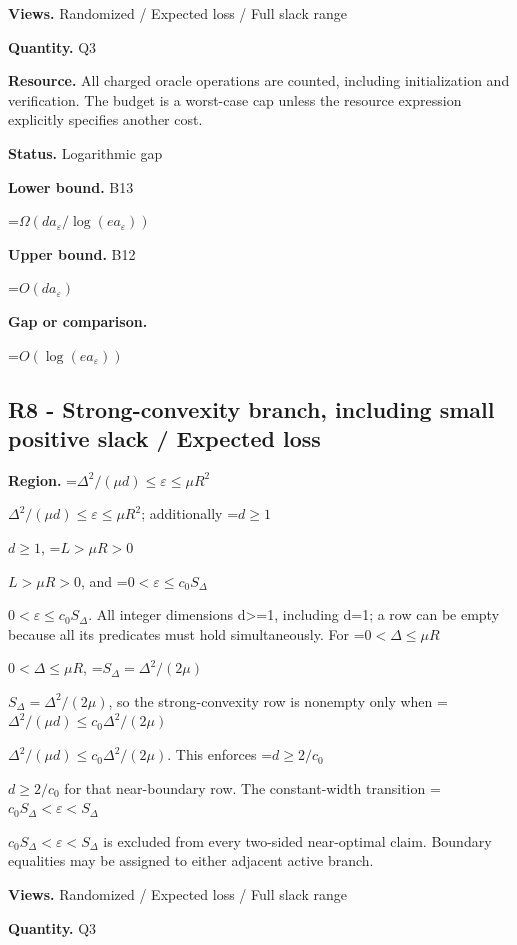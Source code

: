 \documentclass[10pt,a4paper]{article}
\newcommand{\AtlasMath}[1]{\par\begingroup\centering\setbox0=\hbox{$\displaystyle #1$}\ifdim\wd0>1.4\linewidth\typeout{ATLAS WIDE FORMULA: \the\wd0}\fi\ifdim\wd0>\linewidth\resizebox{\linewidth}{!}{\box0}\else\box0\fi\par\endgroup}
\newcommand{\AtlasInlineMath}[1]{\begingroup\setbox0=\hbox{$#1$}\ifdim\wd0>.4\linewidth\endgroup\AtlasMath{#1}\else\endgroup$#1$\fi}
\begin{document}
\textbf{Views.} Randomized / Expected loss / Full slack range



\textbf{Quantity.} Q3



\textbf{Resource.} All charged oracle operations are counted, including initialization and verification. The budget is a worst-case cap unless the resource expression explicitly specifies another cost.



\textbf{Status.} Logarithmic gap



\textbf{Lower bound.} B13



\AtlasMath{\Omega(da_\varepsilon/\log(ea_\varepsilon))}


\textbf{Upper bound.} B12



\AtlasMath{O(da_\varepsilon)}


\textbf{Gap or comparison.}



\AtlasMath{O(\log(ea_\varepsilon))}


\subsection{R8 - Strong-convexity branch, including small positive slack / Expected loss}


\textbf{Region.} \AtlasInlineMath{\Delta^2/(\mu d)\le\varepsilon\le\mu R^2}; additionally \AtlasInlineMath{d\ge1}, \AtlasInlineMath{L>\mu R>0}, and \AtlasInlineMath{0<\varepsilon\le c_0S_\Delta}. All integer dimensions d>=1, including d=1; a row can be empty because all its predicates must hold simultaneously. For \AtlasInlineMath{0<\Delta\le\mu R}, \AtlasInlineMath{S_\Delta=\Delta^2/(2\mu)}, so the strong-convexity row is nonempty only when \AtlasInlineMath{\Delta^2/(\mu d)\le c_0\Delta^2/(2\mu)}. This enforces \AtlasInlineMath{d\ge2/c_0} for that near-boundary row. The constant-width transition \AtlasInlineMath{c_0S_\Delta<\varepsilon<S_\Delta} is excluded from every two-sided near-optimal claim. Boundary equalities may be assigned to either adjacent active branch.



\textbf{Views.} Randomized / Expected loss / Full slack range



\textbf{Quantity.} Q3
\end{document}
